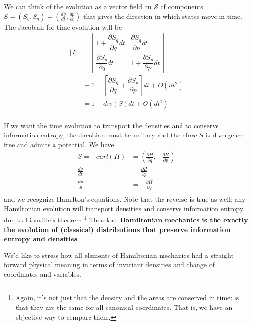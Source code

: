 \documentclass[11pt]{article}
\begin{document}
We can think of the evolution as a vector field on $\mathcal{S}$ of components $S = (S_q, S_q) = (\frac{dq}{dt}, \frac{dp}{dt})$ that gives the direction in which states move in time. The Jacobian for time evolution will be
\begin{equation}
\label{Jacobian_evolution}
\begin{aligned}
|J| &= \left| \begin{matrix}
1 + \dfrac{\partial S_q}{\partial q}dt & \dfrac{\partial S_q}{\partial p} dt \\[2.2ex]
\dfrac{\partial S_p}{\partial q}  dt & 1 + \dfrac{\partial S_p}{\partial p} dt \end{matrix} \right| \\
&= 1 + \left[ \dfrac{\partial S_q}{\partial q} + \dfrac{\partial S_p}{\partial p} \right]dt + O(dt^2)\\
&= 1 + div(S)dt + O(dt^2)\\
\end{aligned}
\end{equation}

If we want the time evolution to transport the densities and to conserve information entropy, the Jacobian must be unitary and therefore $S$ is divergence-free and admits a potential. We have
\begin{equation}
\label{Potential_Hamilton}
\begin{aligned}
S = - curl(H) &= (\frac{\partial H}{\partial q}, - \frac{\partial H}{\partial p}) \\
\frac{dq}{dt} &= \frac{\partial H}{\partial p}  \\
\frac{dp}{dt} &= - \frac{\partial H}{\partial q}  \\
\end{aligned}
\end{equation}
and we recognize Hamilton's equations. Note that the reverse is true as well: any Hamiltonian evolution will transport densities and conserve information entropy due to Liouville's theorem.\footnote{Again, it's not just that the density and the areas are conserved in time: is that they are the same for all canonical coordinates. That is, we have an objective way to compare them.} Therefore \textbf{Hamiltonian mechanics is the exactly the evolution of (classical) distributions that preserve information entropy and densities}.

We'd like to stress how all elements of Hamiltonian mechanics had a straight forward physical meaning in terms of invariant densities and change of coordinates and variables.
\end{document}
